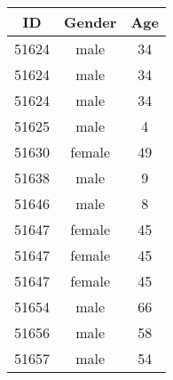 \documentclass{article}
\begin{document}
\captionsetup[table]{labelformat=empty,skip=1pt}
\begin{longtable}{ccc}
\toprule
ID & Gender & Age \\ 
\midrule
51624 & male & 34 \\ 
51624 & male & 34 \\ 
51624 & male & 34 \\ 
51625 & male & 4 \\ 
51630 & female & 49 \\ 
51638 & male & 9 \\ 
51646 & male & 8 \\ 
51647 & female & 45 \\ 
51647 & female & 45 \\ 
51647 & female & 45 \\ 
51654 & male & 66 \\ 
51656 & male & 58 \\ 
51657 & male & 54 \\ 
\bottomrule
\end{longtable}
\end{document}
